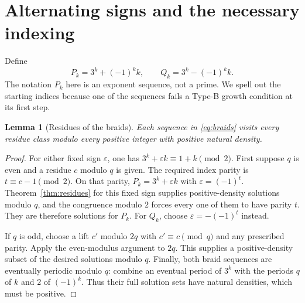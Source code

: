 \documentclass[11pt,a4paper]{article}
\newtheorem{lemma}[theorem]{Lemma}
\theoremstyle{definition}\newtheorem{definition}[theorem]{Definition}
\theoremstyle{remark}\newtheorem{remark}[theorem]{Remark}
\begin{document}
\section{Alternating signs and the necessary indexing}
Define
\begin{equation}\label{eq:braids}
 P_k=3^k+(-1)^k k,\qquad Q_k=3^k-(-1)^k k.
\end{equation}
The notation $P_k$ here is an exponent sequence, not a prime. We
spell out the starting indices because one of the sequences fails a
Type-B growth condition at its first step.

\begin{lemma}[Residues of the braids]\label{lem:braidres}
Each sequence in \eqref{eq:braids} visits every residue class modulo
every positive integer with positive natural density.
\end{lemma}
\begin{proof}
For either fixed sign $\varepsilon$, one has
$3^k+\varepsilon k\equiv1+k\pmod2$.
First suppose $q$ is even and a residue $c$ modulo $q$ is given.
The required index parity is $t\equiv c-1\pmod2$. On that parity,
$P_k=3^k+\varepsilon k$ with $\varepsilon=(-1)^t$.
Theorem~\ref{thm:residues} for this fixed sign supplies positive-density
solutions modulo $q$, and the congruence modulo $2$ forces every one
of them to have parity $t$. They are therefore solutions for $P_k$.
For $Q_k$, choose $\varepsilon=-(-1)^t$ instead.

If $q$ is odd, choose a lift $c'$ modulo $2q$ with $c'\equiv c\pmod q$
and any prescribed parity. Apply the even-modulus argument to $2q$.
This supplies a positive-density subset of the desired solutions
modulo $q$. Finally, both braid sequences are eventually periodic
modulo $q$: combine an eventual period of $3^k$ with the periods
$q$ of $k$ and $2$ of $(-1)^k$. Thus their full solution sets have
natural densities, which must be positive.
\end{proof}
\end{document}
